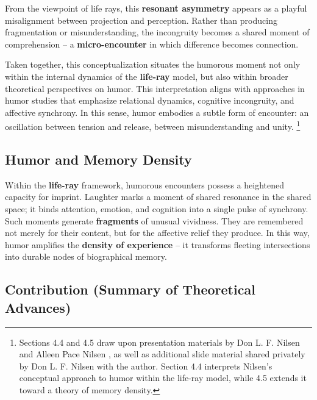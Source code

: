 From the viewpoint of life rays, this \textbf{resonant asymmetry} appears as a
playful misalignment between projection and perception. Rather than producing
fragmentation or misunderstanding, the incongruity becomes a shared moment of
comprehension -- a \textbf{micro-encounter} in which difference becomes connection.

Taken together, this conceptualization situates the humorous moment not only within
the internal dynamics of the \textbf{life-ray} model, but also within broader theoretical
perspectives on humor. This interpretation aligns with approaches in humor studies
that emphasize relational dynamics, cognitive incongruity, and affective synchrony.
In this sense, humor embodies a subtle form of encounter: an oscillation between
tension and release,  between misunderstanding and unity. \footnote{Sections 4.4 and 4.5 draw upon presentation materials
by Don L. F. Nilsen and Alleen Pace Nilsen \cite{nilsen2023philosophy,nilsen2024humor_theories,nilsen2025humor_computers},
as well as additional slide material shared privately by Don L. F. Nilsen with the author.
Section 4.4 interprets Nilsen’s conceptual approach to humor within the life-ray model,
while 4.5 extends it toward a theory of memory density.}


\subsection{Humor and Memory Density}

Within the \textbf{life-ray} framework, humorous encounters possess a heightened capacity for imprint.
Laughter marks a moment of shared resonance in the shared space;
it binds attention, emotion, and cognition into a single pulse of synchrony.
Such moments generate \textbf{fragments} of unusual vividness.
They are remembered not merely for their content, but for the affective relief they produce.
In this way, humor amplifies the \textbf{density of experience} --
it transforms fleeting intersections into durable nodes of biographical memory.

\subsection{Contribution (Summary of Theoretical Advances)}


